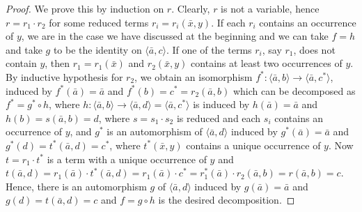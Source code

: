 \documentclass[10pt,a4paper]{article}
\theoremstyle{note}
\begin{document}
\begin{proof}
We prove this by induction on $r$. Clearly, $r$ is not a variable, hence $r=r_1\cdot r_2$  for some reduced terms $r_i= r_i(\bar{x},y)$.  If each $r_i$ contains an occurrence of $y$, we are in the case we have discussed at the beginning and we can take $f=h$ and take $g$ to be the identity on  $\langle \bar{a},c\rangle$. If one of the terms $r_i$, say $r_1$, does not contain $y$, then $r_1= r_1(\bar{x})$  and $r_2(\bar{x},y)$ contains at least two occurrences of $y$. By inductive hypothesis for $r_2$,   we obtain an isomorphism $f^\ast:\langle \bar{a},b\rangle\rightarrow \langle\bar{a},c^\ast\rangle$, induced by  $f^\ast(\bar{a})=\bar{a}$  and $f^\ast(b)=c^\ast= r_2(\bar{a},b)$ which can be decomposed as  $f^\ast = g^\ast\circ h$, where $h:\langle\bar{a},b\rangle \rightarrow \langle\bar{a},d\rangle =\langle \bar{a},c^\ast\rangle$ is induced by $h(\bar{a})=\bar{a}$ and  $h(b)= s(\bar{a},b)=d$, where $s =s_1\cdot s_2$ is reduced and each $s_i $  contains an occurrence of $y$,  and  $g^\ast$ is an automorphism of $\langle\bar{a},d\rangle$ induced by $g^\ast(\bar{a})=\bar{a}$  and  $g^\ast(d)=t^\ast(\bar{a},d)= c^\ast$, where $t^\ast(\bar{x},y)$  contains a unique occurrence of $y$. Now  $t= r_1\cdot t^\ast$  is a term with a unique occurrence of $y$  and  $t(\bar{a},d)= r_1(\bar{a})\cdot t^\ast(\bar{a},d)= r_1(\bar{a})\cdot c^\ast= r_1^\ast(\bar{a})\cdot r_2(\bar{a},b)= r(\bar{a},b)= c$. Hence, there is an automorphism $g$ of $\langle\bar{a},d\rangle$  induced by  $g(\bar{a})=\bar{a}$  and  $g(d)= t(\bar{a},d)= c$  and $f= g\circ h$  is the desired decomposition.
\end{proof}
\end{document}
